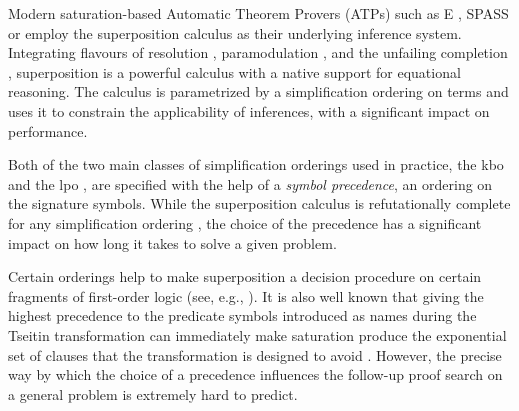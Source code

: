 




Modern saturation-based Automatic Theorem Provers (ATPs) such as E \cite{SCV:CADE-2019}, SPASS \cite{DBLP:conf/cade/WeidenbachDFKSW09} 
or \Vampire{} \cite{DBLP:conf/cav/KovacsV13}
employ the superposition calculus \cite{DBLP:journals/logcom/BachmairG94,DBLP:books/el/RV01/NieuwenhuisR01} as their underlying inference system.
Integrating flavours of resolution \cite{DBLP:books/el/RV01/BachmairG01}, paramodulation \cite{Robinson1983}, and 
the unfailing completion \cite{Bachmair89completionwithout}, superposition is a powerful calculus with 
a native support for equational reasoning. The calculus is parametrized by a simplification ordering on terms %
and uses it to constrain the applicability of inferences, with a significant impact on performance.

Both of the two main classes of simplification orderings used in practice,
the \acrlong*{kbo} \cite{Knuth1983}
and the \acrlong*{lpo} \cite{Kamin1980},
are specified with the help of a 
\emph{symbol precedence}, an ordering on the signature symbols. %
While the superposition calculus is refutationally complete for any simplification ordering \cite{DBLP:journals/logcom/BachmairG94},
the choice of the precedence has a significant impact on how long it takes to solve a given problem.

Certain orderings help to make superposition a decision procedure on certain fragments of first-order logic 
(see, e.g., \cite{DBLP:conf/lics/GanzingerN99,DBLP:conf/cade/HustadtKS05}).
It is also well known that giving the highest precedence to the predicate symbols introduced as names 
during the Tseitin transformation %
\cite{Tseitin1983} can immediately make saturation produce the exponential 
set of clauses that the transformation is designed to avoid \cite{Reger2016}.
%
However, the precise way by which the choice of a precedence 
influences the follow-up proof search on a general problem is extremely hard to predict. %

